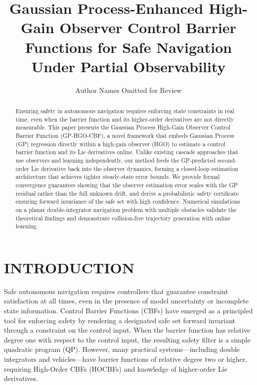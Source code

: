 \documentclass[letterpaper, 10 pt, conference]{ieeeconf}
\title{\LARGE \bf
Gaussian Process-Enhanced High-Gain Observer Control Barrier Functions for Safe Navigation Under Partial Observability
}
\author{Author Names Omitted for Review%
}
\begin{document}
\maketitle
\thispagestyle{empty}
\pagestyle{empty}

\begin{abstract}
Ensuring safety in autonomous navigation requires enforcing state constraints in real time, even when the barrier function and its higher-order derivatives are not directly measurable. This paper presents the Gaussian Process High-Gain Observer Control Barrier Function (GP-HGO-CBF), a novel framework that embeds Gaussian Process (GP) regression directly within a high-gain observer (HGO) to estimate a control barrier function and its Lie derivatives online. Unlike existing cascade approaches that use observers and learning independently, our method feeds the GP-predicted second-order Lie derivative back into the observer dynamics, forming a closed-loop estimation architecture that achieves tighter steady-state error bounds. We provide formal convergence guarantees showing that the observer estimation error scales with the GP residual rather than the full unknown drift, and derive a probabilistic safety certificate ensuring forward invariance of the safe set with high confidence. Numerical simulations on a planar double-integrator navigation problem with multiple obstacles validate the theoretical findings and demonstrate collision-free trajectory generation with online learning.
\end{abstract}

\section{INTRODUCTION}
\label{sec:introduction}

Safe autonomous navigation requires controllers that guarantee constraint satisfaction at all times, even in the presence of model uncertainty or incomplete state information. Control Barrier Functions (CBFs) \cite{ames2017cbf} have emerged as a principled tool for enforcing safety by rendering a designated safe set forward invariant through a constraint on the control input. When the barrier function has relative degree one with respect to the control input, the resulting safety filter is a simple quadratic program (QP). However, many practical systems---including double integrators and vehicles---have barrier functions of relative degree two or higher, requiring High-Order CBFs (HOCBFs) \cite{xiao2019hocbf} and knowledge of higher-order Lie derivatives.
\end{document}
